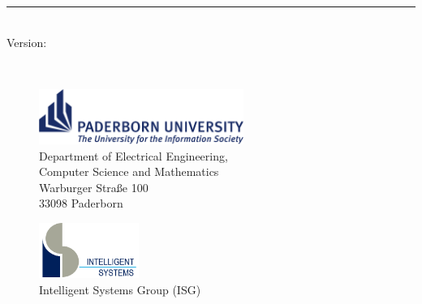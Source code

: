 %
\begin{titlepage}
	\sffamily\
	\flushright\
	\hfill
	\vfill
	{\color{ctcolortitle}\LARGE\thesisTitle\ \par}
	\rule[5pt]{\textwidth}{.4pt} \par
	{\Large\thesisName}
	\vfill
	\textit{\large\thesisDate} \\
	Version: \thesisVersion\
\end{titlepage}


\begin{titlepage}
	\sffamily\

	\begin{figure}
	\begin{minipage}[t]{8.5cm}
	\includegraphics[height=1.8cm]{gfx/upb_1E}\\
	\textsf{\small{\hspace*{1.3cm}Department of Electrical Engineering,\\
	\hspace*{1.3cm}Computer Science and Mathematics\\
		\hspace*{1.3cm}Warburger Straße 100 \\
		\hspace*{1.3cm}33098 Paderborn
		}}
	\end{minipage}
	\hfill
	\begin{minipage}[t]{5cm}
	\includegraphics[height=1.8cm]{gfx/is-logo-klein}\\
	\textsf{%
	\hspace*{0.1cm}\small{Intelligent Systems Group (ISG)}
	}
	\end{minipage}
	\end{figure}


\end{titlepage}
